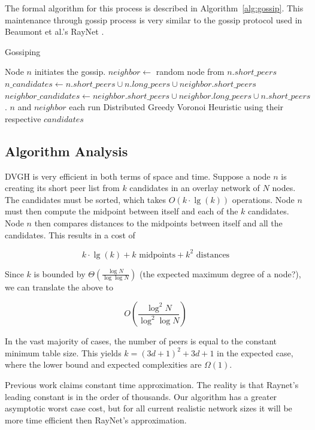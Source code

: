 \documentclass[11pt, conference, letterpaper]{IEEEtran}
\begin{document}
The formal algorithm for this process is described in Algorithm~\ref{alg:gossip}.
This maintenance through gossip process is very similar to the gossip protocol used in Beaumont et al.'s RayNet \cite{raynet}.


\begin{algorithm}
\caption{Gossiping}
\label{alg:gossip}
\begin{algorithmic}[1]  %
	\STATE Node $n$ initiates the gossip.
	\STATE $neighbor \leftarrow$ random node from $n.short\_peers$
   \STATE $n\_candidates \leftarrow n.short\_peers \cup n.long\_peers \cup neighbor.short\_peers$
   \STATE $neighbor\_candidates \leftarrow neighbor.short\_peers \cup neighbor.long\_peers \cup n.short\_peers$.  
   \STATE $n$ and $neighbor$ each run Distributed Greedy Voronoi Heuristic using their respective $candidates$
\end{algorithmic} 
\end{algorithm}


\subsection{Algorithm Analysis}

DVGH is very efficient in both terms of space and time.
Suppose a node $n$ is creating its short peer list from $k$ candidates in an overlay network of $N$ nodes. 
The candidates must be sorted, which takes $O(k\cdot\lg(k))$ operations.  
Node $n$ must then compute the midpoint between itself and each of the $k$ candidates.  
Node $n$ then compares distances to the midpoints between itself and all the candidates.  
This results in a cost of 

\[ k\cdot\lg(k) + k \text{ midpoints}  + k^{2} \text{ distances} \]


Since $k$ is  bounded by $\Theta(\frac{\log N}{\log \log N} )$ \cite{bern1991expected} (the expected maximum degree of a node?), we can translate the above to

\[O(\frac{\log^{2} N}{\log^{2} \log N} )\]

In the vast majority of cases, the number of peers is equal to the constant minimum table size. 
This yields $k=(3d+1)^2+3d+1$ in the expected case, where the lower bound and expected complexities are $\Omega(1)$.

Previous work \cite{raynet} claims constant time approximation. 
The reality is that Raynet's leading constant is in the order of thousands. %
Our algorithm has a greater asymptotic worst case cost, but for all current realistic network sizes it will be more time efficient then RayNet's approximation.
\end{document}
